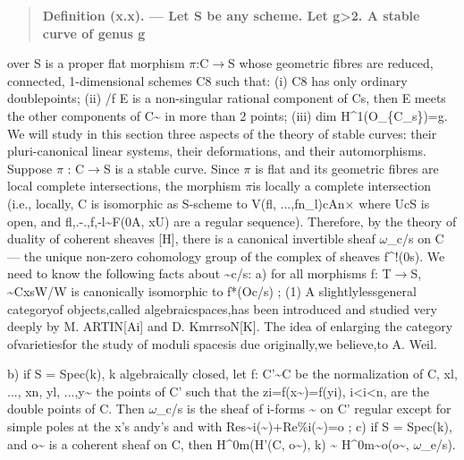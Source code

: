 \documentclass[11pt]{article}
\theoremstyle{plain}
\theoremstyle{definition}
\theoremstyle{remark}
\begin{document}
\begin{quote}\textbf{Definition (x.x). --- Let S be any scheme. Let g>2. A stable curve of genus g}\end{quote}
over S is a proper flat morphism $\pi$:C$\to$S whose geometric fibres are reduced, connected, 1-dimensional schemes C8 such that: (i) C8 has only ordinary doublepoints; (ii) /f E is a non-singular rational component of Cs, then E meets the other components of C\textasciitilde{} in more than 2 points; (iii) dim H\textasciicircum{}1(O\_\{C\_s\})=g. We will study in this section three aspects of the theory of stable curves: their pluri-canonical linear systems, their deformations, and their automorphisms. Suppose $\pi$ : C$\to$S is a stable curve. Since $\pi$ is flat and its geometric fibres are local complete intersections, the morphism $\pi$is locally a complete intersection (i.e., locally, C is isomorphic as S-scheme to V(fl, ...,fn\_l)cAn$\times$ where UcS is open, and fl,.-.,f,-l\textasciitilde{}F(0A, xU) are a regular sequence). Therefore, by the theory of duality of coherent sheaves [H], there is a canonical invertible sheaf $\omega$\_c/s on C --- the unique non-zero cohomology group of the complex of sheaves f\textasciicircum{}!(0s). We need to know the following facts about \textasciitilde{}c/s: a) for all morphisms f: T$\to$S, \textasciitilde{}CxsW/W is canonically isomorphic to f*(Oc/s) ; (1) A slightlylessgeneral categoryof objects,called algebraicspaces,has been introduced and studied very deeply by M. ARTIN[Ai] and D. KmrrsoN[K]. The idea of enlarging the category ofvarietiesfor the study of moduli spacesis due originally,we believe,to A. Weil.

b) if S = Spec(k), k algebraically closed, let f: C'\textasciitilde{}C be the normalization of C, xl, ..., xn, yl, ...,y\textasciitilde{} the points of C' such that the zi=f(x\textasciitilde{})=f(yi), i<i<n, are the double points of C. Then $\omega$\_c/s is the sheaf of i-forms \textasciitilde{} on C' regular except for simple poles at the x's andy's and with Res\textasciitilde{}i(\textasciitilde{})+Re\%i(\textasciitilde{})=o ; c) if S = Spec(k), and o\textasciitilde{} is a coherent sheaf on C, then H\textasciicircum{}0m(H'(C, o\textasciitilde{}), k) \textasciitilde{} H\textasciicircum{}0m\textasciitilde{}o(o\textasciitilde{}, $\omega$\_e/s).
\end{document}

